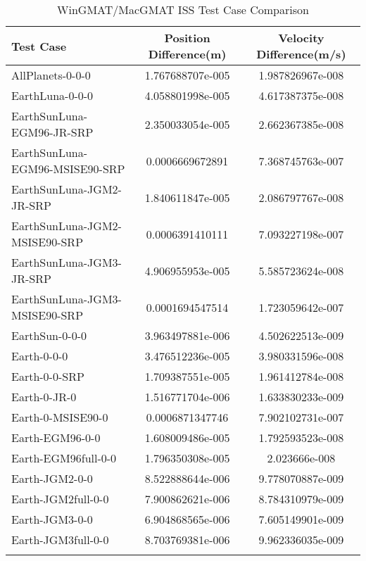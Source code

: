 \begin{table}[htbp!]
\centering
\caption{ WinGMAT/MacGMAT ISS Test Case Comparison}
      \begin{tabular}{lcc}
      \hline\hline
          Test Case & Position Difference(m) & Velocity Difference(m/s) \\
         \hline
         AllPlanets-0-0-0 & 1.767688707e-005 & 1.987826967e-008 \\
         EarthLuna-0-0-0 & 4.058801998e-005 & 4.617387375e-008 \\
         EarthSunLuna-EGM96-JR-SRP & 2.350033054e-005 & 2.662367385e-008 \\
         EarthSunLuna-EGM96-MSISE90-SRP & 0.0006669672891 & 7.368745763e-007 \\
         EarthSunLuna-JGM2-JR-SRP & 1.840611847e-005 & 2.086797767e-008 \\
         EarthSunLuna-JGM2-MSISE90-SRP & 0.0006391410111 & 7.093227198e-007 \\
         EarthSunLuna-JGM3-JR-SRP & 4.906955953e-005 & 5.585723624e-008 \\
         EarthSunLuna-JGM3-MSISE90-SRP & 0.0001694547514 & 1.723059642e-007 \\
         EarthSun-0-0-0 & 3.963497881e-006 & 4.502622513e-009 \\
         Earth-0-0-0 & 3.476512236e-005 & 3.980331596e-008 \\
         Earth-0-0-SRP & 1.709387551e-005 & 1.961412784e-008 \\
         Earth-0-JR-0 & 1.516771704e-006 & 1.633830233e-009 \\
         Earth-0-MSISE90-0 & 0.0006871347746 & 7.902102731e-007 \\
         Earth-EGM96-0-0 & 1.608009486e-005 & 1.792593523e-008 \\
         Earth-EGM96full-0-0 & 1.796350308e-005 & 2.023666e-008 \\
         Earth-JGM2-0-0 & 8.522888644e-006 & 9.778070887e-009 \\
         Earth-JGM2full-0-0 & 7.900862621e-006 & 8.784310979e-009 \\
         Earth-JGM3-0-0 & 6.904868565e-006 & 7.605149901e-009 \\
         Earth-JGM3full-0-0 & 8.703769381e-006 & 9.962336035e-009 \\
      \hline\hline
      \label{Table: ISS WinGMAT-MacGMAT Table} 
\end{tabular}
\end{table}
